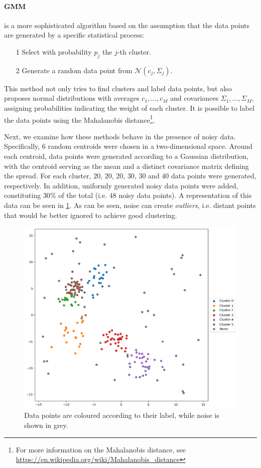\paragraph{GMM} is a more sophisticated algorithm based on the assumption that the data points are generated by a specific statistical process:
\begin{itemize}
    \item[1] Select with probability $p_j$ the $j$-th cluster.
    \item[2] Generate a random data point from $\mathcal{N}(c_j, \Sigma_j)$.
\end{itemize}
This method not only tries to find clusters and label data points, but also proposes normal distributions with averages $c_1,\dots,c_M$ and covariances $\Sigma_1,\dots,\Sigma_M$, assigning probabilities indicating the weight of each cluster. It is possible to label the data points using the Mahalanobis distance\footnote{For more information on the Mahalanobis distance, see \url{https://en.wikipedia.org/wiki/Mahalanobis_distance}}.

\bigskip
\noindent Next, we examine how these methods behave in the presence of noisy data. Specifically, $6$ random centroids were chosen in a two-dimensional space. Around each centroid, data points were generated according to a Gaussian distribution, with the centroid serving as the mean and a distinct covariance matrix defining the spread. For each cluster, $20$, $20$, $20$, $30$, $30$ and $40$ data points were generated, respectively. In addition, uniformly generated noisy data points were added, constituting $30\%$ of the total (i.e. $48$ noisy data points). A representation of this data can be seen in \cref{fig:data_true}. As can be seen, noise can create \textit{outliers}, i.e. distant points that would be better ignored to achieve good clustering.

\begin{figure}[H]
    \centering
    \includegraphics[width=0.9\linewidth]{Figures/dati_veri.png}
    \caption[Example of data for clustering]{Data points are coloured according to their label, while noise is shown in grey.}
    \label{fig:data_true}
\end{figure}


